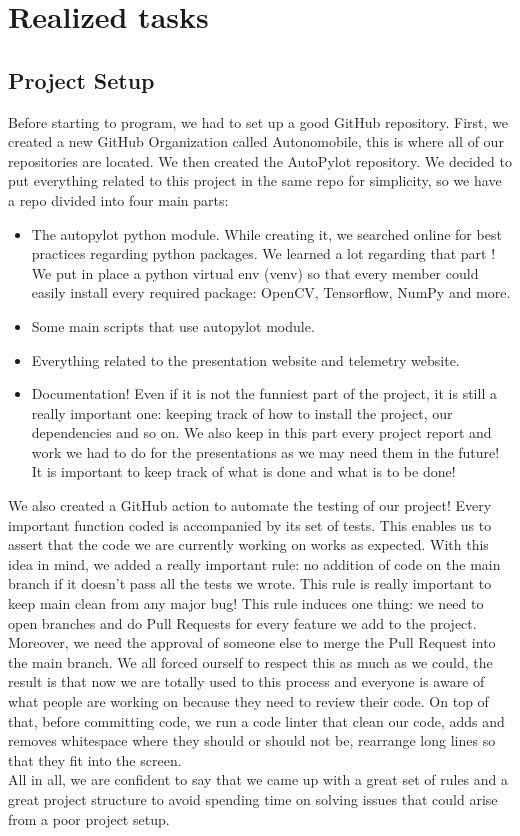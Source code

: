 \documentclass[12pt]{article}
\begin{document}
\section{Realized tasks}

\subsection{Project Setup}
Before starting to program, we had to set up a good GitHub repository. First, we created a new GitHub Organization called Autonomobile, this is where all of our repositories are located. We then created the AutoPylot repository. We decided to put everything related to this project in the same repo for simplicity, so we have a repo divided into four main parts:
\begin{itemize}
\item The autopylot python module. While creating it, we searched online for best practices regarding python packages. We learned a lot regarding that part ! We put in place a python virtual env (venv) so that every member could easily install every required package: OpenCV, Tensorflow, NumPy and more.
\item Some main scripts that use autopylot module.
\item Everything related to the presentation website and telemetry website.
\item Documentation! Even if it is not the funniest part of the project, it is still a really important one: keeping track of how to install the project, our dependencies and so on. We also keep in this part every project report and work we had to do for the presentations as we may need them in the future! It is important to keep track of what is done and what is to be done!
\end{itemize}
We also created a GitHub action to automate the testing of our project! Every important function coded is accompanied by its set of tests. This enables us to assert that the code we are currently working on works as expected. With this idea in mind, we added a really important rule: no addition of code on the main branch if it doesn't pass all the tests we wrote. This rule is really important to keep main clean from any major bug! This rule induces one thing: we need to open branches and do Pull Requests for every feature we add to the project. Moreover, we need the approval of someone else to merge the Pull Request into the main branch. We all forced ourself to respect this as much as we could, the result is that now we are totally used to this process and everyone is aware of what people are working on because they need to review their code.
On top of that, before committing code, we run a code linter that clean our code, adds and removes whitespace where they should or should not be, rearrange long lines so that they fit into the screen. \\
All in  all, we are confident to say that we came up with a great set of rules and a great project structure to avoid spending time on solving issues that could arise from a poor project setup.
\newpage
\end{document}
